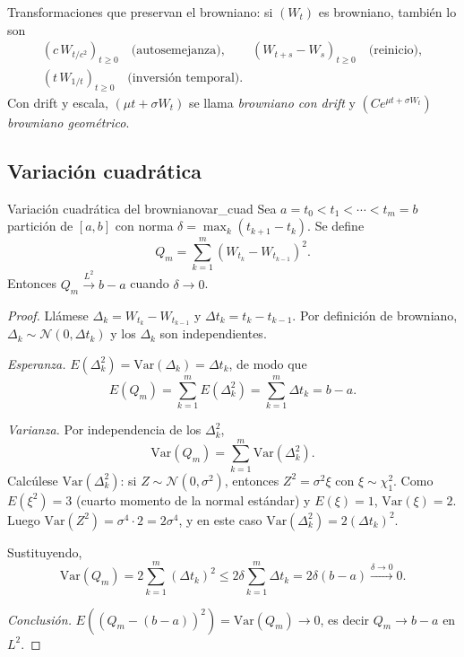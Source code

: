 \documentclass[11pt, a4paper]{article}
\begin{document}
\obs Transformaciones que preservan el browniano: si $(W_t)$ es browniano, también lo son
\begin{gather*}
(c \, W_{t/c^2})_{t \ge 0} \quad \text{(autosemejanza)}, \qquad
(W_{t+s} - W_s)_{t \ge 0} \quad \text{(reinicio)}, \\
(t \, W_{1/t})_{t \ge 0} \quad \text{(inversión temporal)}.
\end{gather*}
Con drift y escala, $(\mu t + \sigma W_t)$ se llama \emph{browniano con drift} y
$(C e^{\mu t + \sigma W_t})$ \emph{browniano geométrico}.

\subsection{Variación cuadrática}

\begin{teorema}{Variación cuadrática del browniano}{var_cuad}
Sea $a = t_0 < t_1 < \cdots < t_m = b$ partición de $[a, b]$ con norma
$\delta = \max_k (t_{k+1} - t_k)$. Se define
$$ Q_m = \sum_{k=1}^m (W_{t_k} - W_{t_{k-1}})^2. $$
Entonces $Q_m \xrightarrow{L^2} b - a$ cuando $\delta \to 0$.
\end{teorema}

\begin{proof}
Llámese $\Delta_k = W_{t_k} - W_{t_{k-1}}$ y $\Delta t_k = t_k - t_{k-1}$. Por definición de
browniano, $\Delta_k \sim \mathcal{N}(0, \Delta t_k)$ y los $\Delta_k$ son independientes.

\textit{Esperanza.} $E(\Delta_k^2) = \mathrm{Var}(\Delta_k) = \Delta t_k$, de modo que
$$ E(Q_m) = \sum_{k=1}^m E(\Delta_k^2) = \sum_{k=1}^m \Delta t_k = b - a. $$

\textit{Varianza.} Por independencia de los $\Delta_k^2$,
$$ \mathrm{Var}(Q_m) = \sum_{k=1}^m \mathrm{Var}(\Delta_k^2). $$
Calcúlese $\mathrm{Var}(\Delta_k^2)$: si $Z \sim \mathcal{N}(0, \sigma^2)$, entonces
$Z^2 = \sigma^2
\xi$ con $\xi \sim \chi^2_1$. Como $E(\xi^2) = 3$ (cuarto momento de la normal estándar) y
$E(\xi) = 1$, $\mathrm{Var}(\xi) = 2$. Luego $\mathrm{Var}(Z^2) = \sigma^4 \cdot 2 = 2 \sigma^4$, y
en este caso $\mathrm{Var}(\Delta_k^2) = 2 (\Delta t_k)^2$.

Sustituyendo,
$$ \mathrm{Var}(Q_m) = 2 \sum_{k=1}^m (\Delta t_k)^2 \le 2 \delta \sum_{k=1}^m \Delta t_k =
2 \delta (b - a) \xrightarrow{\delta \to 0} 0. $$

\textit{Conclusión.} $E((Q_m - (b - a))^2) = \mathrm{Var}(Q_m) \to 0$, es decir $Q_m \to b - a$
en $L^2$.
\end{proof}
\end{document}
